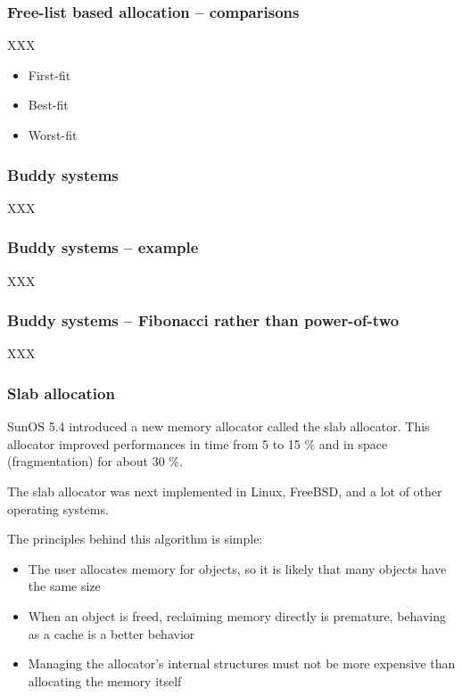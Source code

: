 
\begin{frame}
  \frametitle{Free-list based allocation -- comparisons}

  XXX

  \begin{itemize}
  \item
    First-fit
  \item
    Best-fit
  \item
    Worst-fit
  \end{itemize}

\end{frame}


\begin{frame}
  \frametitle{Buddy systems}

  XXX

\end{frame}


\begin{frame}
  \frametitle{Buddy systems -- example}

  XXX

\end{frame}


\begin{frame}
  \frametitle{Buddy systems -- Fibonacci rather than power-of-two}

  XXX

\end{frame}


\begin{frame}
  \frametitle{Slab allocation}

  SunOS 5.4 introduced a new memory allocator called the slab
  allocator. This allocator improved performances in time from 5 to 15
  \% and in space (fragmentation) for about 30 \%.

  \-

  The slab allocator was next implemented in Linux, FreeBSD, and a lot
  of other operating systems.

  \-

  The principles behind this algorithm is simple:

  \begin{itemize}
  \item
    The user allocates memory for objects, so it is likely that many
    objects have the same size
  \item
    When an object is freed, reclaiming memory directly is premature,
    behaving as a cache is a better behavior
  \item
    Managing the allocator's internal structures must not be more
    expensive than allocating the memory itself
  \end{itemize}

\end{frame}

